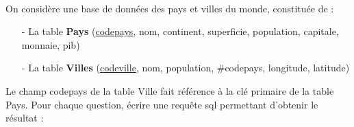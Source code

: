 \documentclass[11pt,a4paper]{article}
\begin{document}
\begin{Exercise}[title = {Quelques requêtes {\sc sql}}]\\
On considère une base de données des pays et villes du monde, constituée de :
\begin{itemize}
    \item[-] La table \textbf{Pays} (\underline{codepays}, nom, continent, superficie, population, capitale, monnaie, pib)
    \item[-] La table \textbf{Villes} (\underline{codeville}, nom, population, \#codepays, longitude, latitude)
\end{itemize}
Le champ codepays de la table Ville fait référence à la clé primaire de la table Pays. Pour chaque question, écrire une requête {\sc sql} permettant d'obtenir le résultat :
\end{Exercise}
\end{document}
